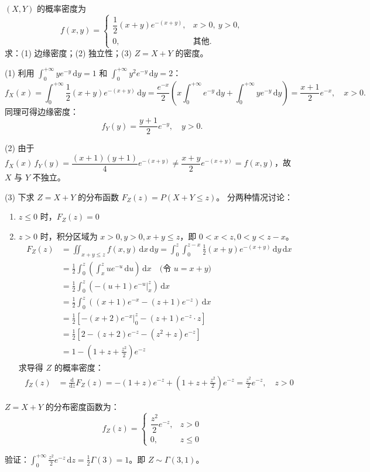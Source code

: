 ﻿\documentclass[lang=cn,11pt]{elegantbook}
\begin{document}
\begin{exercise}[Gamma型联合密度] \label{exer:3-c9b}
$(X,Y)$ 的概率密度为
\[
f(x,y) = \begin{cases} \dfrac{1}{2}(x+y)e^{-(x+y)}, & x>0,\ y>0, \\ 0, & \text{其他}. \end{cases}
\]
求：(1) 边缘密度；(2) 独立性；(3) $Z=X+Y$ 的密度。
\end{exercise}
\begin{solution}
(1) 利用 $\displaystyle\int_0^{+\infty}ye^{-y}\,\mathrm{d}y = 1$ 和 $\displaystyle\int_0^{+\infty}y^2 e^{-y}\,\mathrm{d}y = 2$：
\[
f_X(x) = \int_0^{+\infty} \frac{1}{2}(x+y)e^{-(x+y)} \,\mathrm{d}y = \frac{e^{-x}}{2}\left(x\int_0^{+\infty}e^{-y}\,\mathrm{d}y+\int_0^{+\infty}ye^{-y}\,\mathrm{d}y\right) = \frac{x+1}{2}e^{-x},\quad x>0.
\]
同理可得边缘密度：\[f_Y(y) = \frac{y+1}{2}e^{-y},\quad y>0.\]

(2) 由于 $f_X(x)\,f_Y(y) = \dfrac{(x+1)(y+1)}{4}e^{-(x+y)} \neq \dfrac{x+y}{2}e^{-(x+y)} = f(x,y)$，故 $X$ 与 $Y$ 不独立。

(3) 下求 $Z=X+Y$ 的分布函数 $F_Z(z) = P(X+Y \leqslant z)$。
分两种情况讨论：
\begin{enumerate}
    \item $z \leqslant 0$ 时，$F_Z(z) = 0$
    \item $z > 0$ 时，积分区域为 $x>0, y>0, x+y \leqslant z$，即 $0 < x < z, 0 < y < z-x$。
\begin{align*}
    F_Z(z) &= \iint_{x+y\leqslant z} f(x,y) \,\mathrm{d}x\,\mathrm{d}y = \int_0^z \int_0^{z-x} \frac{1}{2}(x+y)e^{-(x+y)} \,\mathrm{d}y\,\mathrm{d}x \\
    &= \frac{1}{2} \int_0^z \left( \int_x^z u e^{-u} \,\mathrm{d}u \right) \,\mathrm{d}x \quad \text{(令 $u=x+y$)} \\
    &= \frac{1}{2} \int_0^z \left( \left. -(u+1)e^{-u} \right|_x^z \right) \,\mathrm{d}x \\
    &= \frac{1}{2} \int_0^z \left( (x+1)e^{-x} - (z+1)e^{-z} \right) \,\mathrm{d}x \\
    &= \frac{1}{2} \left[ \left. -(x+2)e^{-x} \right|_0^z - (z+1)e^{-z} \cdot z \right] \\
    &= \frac{1}{2} \left[ 2 - (z+2)e^{-z} - (z^2+z)e^{-z} \right] \\
    &= 1 - \left( 1 + z + \frac{z^2}{2} \right) e^{-z}
\end{align*}
求导得 $Z$ 的概率密度：
\begin{align*}
    f_Z(z) &= \frac{\mathrm{d}}{\mathrm{d}z} F_Z(z) = - \left( 1 + z \right) e^{-z} + \left( 1 + z + \frac{z^2}{2} \right) e^{-z} = \frac{z^2}{2}e^{-z}, \quad z>0
\end{align*}
\end{enumerate}
$Z = X + Y$ 的分布密度函数为：
\[
f_Z(z) = \begin{cases} \dfrac{z^2}{2}e^{-z}, & z > 0 \\ 0, & z \leqslant 0 \end{cases}
\]
\begin{note}
验证：$\displaystyle\int_0^{+\infty}\frac{z^2}{2}e^{-z}\,\mathrm{d}z = \frac{1}{2}\Gamma(3) = 1$。即 $Z \sim \Gamma(3,1)$。
\end{note}
\end{solution}
\end{document}
